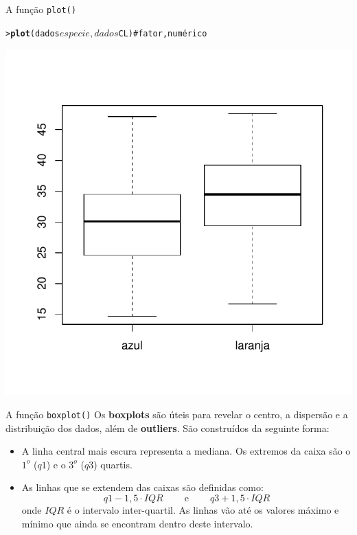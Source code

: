 \documentclass[10pt]{beamer}\usepackage{graphicx, color}
\makeatletter
\newcommand{\hlfunctioncall}[1]{\textcolor[rgb]{0,0,0.545098039215686}{\textbf{#1}}}%
\newcommand{\hlcomment}[1]{\textcolor[rgb]{0.2,0.2,0.2}{#1}}%
\newenvironment{kframe}{%
 \def\at@end@of@kframe{}%
 \ifinner\ifhmode%
  \def\at@end@of@kframe{\end{minipage}}%
  \begin{minipage}{\columnwidth}%
 \fi\fi%
 \def\FrameCommand##1{\hskip\@totalleftmargin \hskip-\fboxsep
 \colorbox{shadecolor}{##1}\hskip-\fboxsep
     \hskip-\linewidth \hskip-\@totalleftmargin \hskip\columnwidth}%
 \MakeFramed {\advance\hsize-\width
   \@totalleftmargin\z@ \linewidth\hsize
   \@setminipage}}%
 {\par\unskip\endMakeFramed%
 \at@end@of@kframe}
\newenvironment{knitrout}{}{} %
\makeatother
\begin{document}
\begin{frame}[fragile=singleslide]{A função \texttt{plot()}}
\begin{knitrout}\small
{}\color{fgcolor}\begin{kframe}
\begin{alltt}
> \hlfunctioncall{plot}(dados$especie, dados$CL)  \hlcomment{# fator, numérico}
\end{alltt}
\end{kframe}

{\centering \includegraphics[width=.7\textwidth]{figure/unnamed-chunk-28} 

}


\end{knitrout}

\end{frame}

\begin{frame}[fragile=singleslide]{A função \texttt{boxplot()}}
Os \textbf{boxplots} são úteis para revelar o centro, a dispersão e a
distribuição dos dados, além de \textbf{outliers}. São construídos da
seguinte forma:
\begin{itemize}
\item A linha central mais escura representa a mediana. Os extremos da
  caixa são o $1^{o}$ ($q1$) e o $3^{o}$ ($q3$) quartis.
\item As linhas que se extendem das caixas são definidas como:
\begin{displaymath}
q1-1,5\cdot IQR\ \qquad \mathrm{e}\ \qquad q3+1,5\cdot IQR
\end{displaymath}
onde $IQR$ é o intervalo inter-quartil. As linhas vão até os valores
máximo e mínimo que ainda se encontram dentro deste intervalo.
\end{itemize}
\end{frame}
\end{document}
